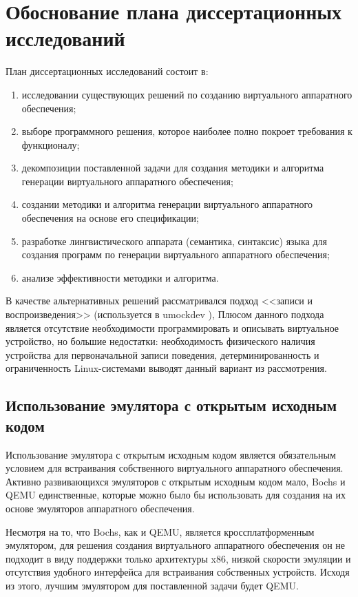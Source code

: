 \section{Обоснование плана диссертационных исследований}\label{sec:ch1/sec3}

План диссертационных исследований состоит в:

\begin{enumerate}[label={\arabic*)}]
    \item исследовании существующих решений по созданию виртуального аппаратного обеспечения;
    \item выборе программного решения, которое наиболее полно покроет требования к функционалу;
    \item декомпозиции поставленной задачи для создания методики и алгоритма генерации виртуального аппаратного обеспечения;
    \item создании методики и алгоритма генерации виртуального аппаратного обеспечения на основе его спецификации;
    \item разработке лингвистического аппарата (семантика, синтаксис) языка для создания программ по генерации виртуального
        аппаратного обеспечения;
    \item анализе эффективности методики и алгоритма.
\end{enumerate}

В качестве альтернативных решений рассматривался подход <<записи и воспроизведения>> (используется в umockdev \cite{umockdev}),
Плюсом данного подхода является отсутствие необходимости программировать и описывать виртуальное устройство,
но большие недостатки: необходимость физического наличия устройства для первоначальной записи
поведения, детерминированность и ограниченность Linux-системами выводят данный вариант из рассмотрения.

\subsection{Использование эмулятора с открытым исходным кодом}\label{sec:ch1/sec4/sub1}

Использование эмулятора с открытым исходным кодом является обязательным
условием для встраивания собственного виртуального аппаратного обеспечения.
Активно развивающихся эмуляторов с открытым исходным кодом мало, Bochs \cite{bochs} и QEMU
единственные, которые можно было бы использовать для создания на их основе
эмуляторов аппаратного обеспечения.

Несмотря на то, что Bochs, как и QEMU, является кроссплатформенным эмулятором,
для решения создания виртуального аппаратного обеспечения
он не подходит в виду поддержки только архитектуры x86, низкой скорости эмуляции
и отсутствия удобного интерфейса для встраивания собственных устройств.
Исходя из этого, лучшим эмулятором для поставленной задачи будет QEMU.

